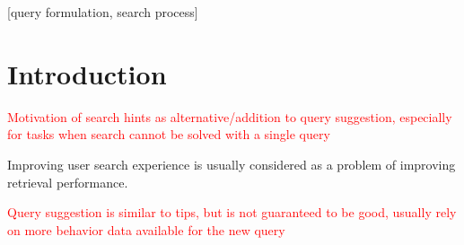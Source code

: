 \documentclass{sig-alternate}
\newcommand\todo[1]{\textcolor{red}{#1}}
\begin{document}
\maketitle
\begin{abstract}
Search engine is a ubiquitous tool used by millions of people on a daily basis.
However, as with every tool, certain skills are required in order to use it efficiently.
Unfortunately users have different experience and not everybody is able to find answers to all questions she is interested in \todo{[find a paper to cite here]}.
Helping users to develop their search skills was included as one of the key research directions by \cite{Allan:2012:FCO:2215676.2215678}. However, the assistance offered by the modern search engines are limited to query suggestion and spelling correction \todo{[something else?]}.
A number of researches are available that study different ways of helping users be more successful with their searches \todo{[cite some reviews, or a couple of different papers]}. 
In this work we study the effect of showing users search tips designed to help asking the better queries when solving a difficult informational search task.
We show that ``the right'' tips can improve users' success rate.
However generic hints might be misleading and detrimental to user search experience.
\end{abstract}

[query formulation, search process]



\section{Introduction}
\todo{Motivation of search hints as alternative/addition to query suggestion, especially for tasks when search cannot be solved with a single query}

Improving user search experience is usually considered as a problem of improving retrieval performance. 

\todo{Query suggestion is similar to tips, but is not guaranteed to be good, usually rely on more behavior data available for the new query}
\end{document}
